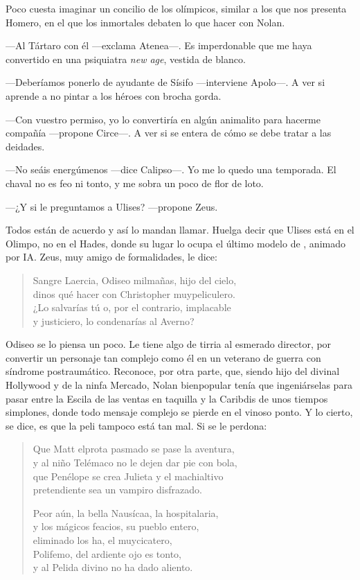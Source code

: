 
Poco cuesta imaginar un concilio de los olímpicos, similar a los que nos presenta Homero, en el que los inmortales debaten lo que hacer con Nolan.

---Al Tártaro con él ---exclama Atenea---. Es imperdonable que me haya convertido en una psiquiatra \emph{new age}, vestida de blanco.

---Deberíamos ponerlo de ayudante de Sísifo ---interviene Apolo---. A ver si aprende a no pintar a los héroes con brocha gorda.

---Con vuestro permiso, yo lo convertiría en algún animalito para hacerme compañía ---propone Circe---. A ver si se entera de cómo se debe tratar a las deidades.

---No seáis energúmenos ---dice Calipso---. Yo me lo quedo una temporada. El chaval no es feo ni tonto, y me sobra un poco de flor de loto.

---¿Y si le preguntamos a Ulises? ---propone Zeus.

Todos están de acuerdo y así lo mandan llamar. Huelga decir que Ulises está en el Olimpo, no en el Hades, donde su lugar lo ocupa el último modelo de , animado por IA. Zeus, muy amigo de formalidades, le dice:

\begin{verse}
Sangre Laercia, Odiseo milmañas, hijo del cielo,\\
dinos qué hacer con Christopher muypeliculero.\\
¿Lo salvarías tú o, por el contrario, implacable\\
y justiciero, lo condenarías al Averno?
\end{verse}

Odiseo se lo piensa un poco. Le tiene algo de tirria al esmerado director, por convertir un personaje tan complejo como él en un veterano de guerra con síndrome postraumático. Reconoce, por otra parte, que, siendo hijo del divinal Hollywood y de la ninfa Mercado, Nolan bienpopular tenía que ingeniárselas para pasar entre la Escila de las ventas en taquilla y la Caribdis de unos tiempos simplones, donde todo mensaje complejo se pierde en el vinoso ponto. Y lo cierto, se dice, es que la peli tampoco está tan mal. Si se le perdona:

\begin{verse}
Que Matt elprota pasmado se pase la aventura,\\
y al niño Telémaco no le dejen dar pie con bola,\\
que Penélope se crea Julieta y el machialtivo\\
pretendiente sea un vampiro disfrazado.

Peor aún, la bella Nausícaa, la hospitalaria,\\
y los mágicos feacios, su pueblo entero,\\
eliminado los ha, el muycicatero,\\
Polifemo, del ardiente ojo es tonto,\\
y al Pelida divino no ha dado aliento.
\end{verse}

